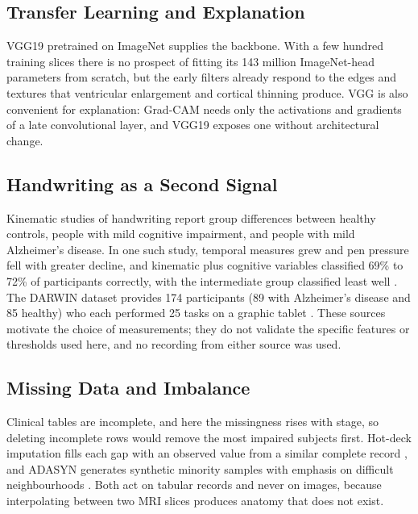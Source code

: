 \documentclass[conference]{IEEEtran}
\begin{document}
\subsection{Transfer Learning and Explanation}
VGG19 \cite{vgg} pretrained on ImageNet \cite{imagenet} supplies the backbone. With a few hundred training slices there is no prospect of fitting its 143 million ImageNet-head parameters from scratch, but the early filters already respond to the edges and textures that ventricular enlargement and cortical thinning produce. VGG is also convenient for explanation: Grad-CAM \cite{gradcam} needs only the activations and gradients of a late convolutional layer, and VGG19 exposes one without architectural change.

\subsection{Handwriting as a Second Signal}
Kinematic studies of handwriting report group differences between healthy controls, people with mild cognitive impairment, and people with mild Alzheimer's disease. In one such study, temporal measures grew and pen pressure fell with greater decline, and kinematic plus cognitive variables classified 69\% to 72\% of participants correctly, with the intermediate group classified least well \cite{werner}. The DARWIN dataset provides 174 participants (89 with Alzheimer's disease and 85 healthy) who each performed 25 tasks on a graphic tablet \cite{darwin}. These sources motivate the choice of measurements; they do not validate the specific features or thresholds used here, and no recording from either source was used.

\subsection{Missing Data and Imbalance}
Clinical tables are incomplete, and here the missingness rises with stage, so deleting incomplete rows would remove the most impaired subjects first. Hot-deck imputation fills each gap with an observed value from a similar complete record \cite{hotdeck}, and ADASYN generates synthetic minority samples with emphasis on difficult neighbourhoods \cite{adasyn}. Both act on tabular records and never on images, because interpolating between two MRI slices produces anatomy that does not exist.
\end{document}
